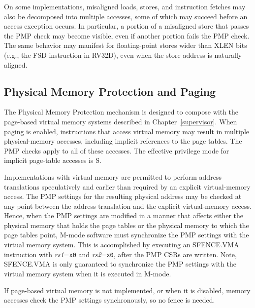 On some implementations, misaligned loads, stores, and instruction fetches may
also be decomposed into multiple accesses, some of which may succeed before an
access exception occurs.  In particular, a portion of a misaligned store
that passes the PMP check may become visible, even if another portion fails
the PMP check.  The same behavior may manifest for floating-point stores wider
than XLEN bits (e.g., the FSD instruction in RV32D), even when the store
address is naturally aligned.

\subsection{Physical Memory Protection and Paging}
\label{pmp-vmem}

The Physical Memory Protection mechanism is designed to compose with the
page-based virtual memory systems described in Chapter~\ref{supervisor}.  When
paging is enabled, instructions that access virtual memory may result in
multiple physical-memory accesses, including implicit references to the page
tables.  The PMP checks apply to all of these accesses.  The effective
privilege mode for implicit page-table accesses is S.

Implementations with virtual memory are permitted to perform address
translations speculatively and earlier than required by an explicit
virtual-memory access.  The PMP settings for the resulting physical address
may be checked at any point between the address translation and the explicit
virtual-memory access.  Hence, when the PMP settings are modified in a manner
that affects either the physical memory that holds the page tables or the
physical memory to which the page tables point, M-mode software must
synchronize the PMP settings with the virtual memory system.  This is
accomplished by executing an SFENCE.VMA instruction with {\em rs1}={\tt x0}
and {\em rs2}={\tt x0}, after the PMP CSRs are written.  Note, SFENCE.VMA is
only guaranteed to synchronize the PMP settings with the virtual memory system
when it is executed in M-mode.

If page-based virtual memory is not implemented, or when it is disabled,
memory accesses check the PMP settings synchronously, so no fence is needed.
